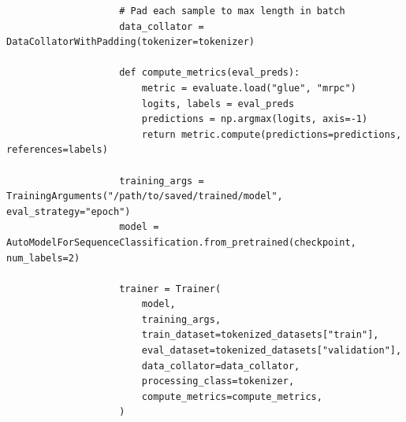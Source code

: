 \begin{itemize}[noitemsep]
\begin{lstlisting}
                    # Pad each sample to max length in batch
                    data_collator = DataCollatorWithPadding(tokenizer=tokenizer)
        
                    def compute_metrics(eval_preds):
                        metric = evaluate.load("glue", "mrpc")
                        logits, labels = eval_preds
                        predictions = np.argmax(logits, axis=-1)
                        return metric.compute(predictions=predictions, references=labels)            
        
                    training_args = TrainingArguments("/path/to/saved/trained/model", eval_strategy="epoch")
                    model = AutoModelForSequenceClassification.from_pretrained(checkpoint, num_labels=2)

                    trainer = Trainer(
                        model,
                        training_args,
                        train_dataset=tokenized_datasets["train"],
                        eval_dataset=tokenized_datasets["validation"],
                        data_collator=data_collator,
                        processing_class=tokenizer,
                        compute_metrics=compute_metrics,
                    )
    \end{lstlisting}
\end{itemize}